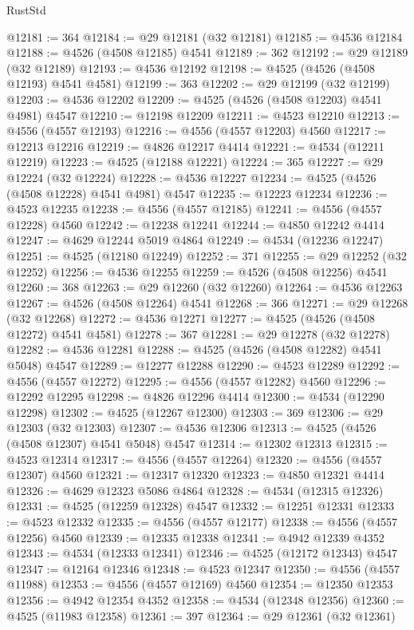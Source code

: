 \begin{lexlean}{RustStd}
\begin{coremodule}
{\begin{coremodule}
{{{{{{{{{{{{{{{{{{{{{{{{{{{{{{{{{{{{{{{{{{{{{{{{{{{{{{{@12181 := 364
@12184 := @29 @12181 (@32 @12181)
@12185 := @4536 @12184
@12188 := @4526 (@4508 @12185) @4541
@12189 := 362
@12192 := @29 @12189 (@32 @12189)
@12193 := @4536 @12192
@12198 := @4525 (@4526 (@4508 @12193) @4541 @4581)
@12199 := 363
@12202 := @29 @12199 (@32 @12199)
@12203 := @4536 @12202
@12209 := @4525 (@4526 (@4508 @12203) @4541 @4981) @4547
@12210 := @12198 @12209
@12211 := @4523 @12210
@12213 := @4556 (@4557 @12193)
@12216 := @4556 (@4557 @12203) @4560
@12217 := @12213 @12216
@12219 := @4826 @12217 @4414
@12221 := @4534 (@12211 @12219)
@12223 := @4525 (@12188 @12221)
@12224 := 365
@12227 := @29 @12224 (@32 @12224)
@12228 := @4536 @12227
@12234 := @4525 (@4526 (@4508 @12228) @4541 @4981) @4547
@12235 := @12223 @12234
@12236 := @4523 @12235
@12238 := @4556 (@4557 @12185)
@12241 := @4556 (@4557 @12228) @4560
@12242 := @12238 @12241
@12244 := @4850 @12242 @4414
@12247 := @4629 @12244 @5019 @4864
@12249 := @4534 (@12236 @12247)
@12251 := @4525 (@12180 @12249)
@12252 := 371
@12255 := @29 @12252 (@32 @12252)
@12256 := @4536 @12255
@12259 := @4526 (@4508 @12256) @4541
@12260 := 368
@12263 := @29 @12260 (@32 @12260)
@12264 := @4536 @12263
@12267 := @4526 (@4508 @12264) @4541
@12268 := 366
@12271 := @29 @12268 (@32 @12268)
@12272 := @4536 @12271
@12277 := @4525 (@4526 (@4508 @12272) @4541 @4581)
@12278 := 367
@12281 := @29 @12278 (@32 @12278)
@12282 := @4536 @12281
@12288 := @4525 (@4526 (@4508 @12282) @4541 @5048) @4547
@12289 := @12277 @12288
@12290 := @4523 @12289
@12292 := @4556 (@4557 @12272)
@12295 := @4556 (@4557 @12282) @4560
@12296 := @12292 @12295
@12298 := @4826 @12296 @4414
@12300 := @4534 (@12290 @12298)
@12302 := @4525 (@12267 @12300)
@12303 := 369
@12306 := @29 @12303 (@32 @12303)
@12307 := @4536 @12306
@12313 := @4525 (@4526 (@4508 @12307) @4541 @5048) @4547
@12314 := @12302 @12313
@12315 := @4523 @12314
@12317 := @4556 (@4557 @12264)
@12320 := @4556 (@4557 @12307) @4560
@12321 := @12317 @12320
@12323 := @4850 @12321 @4414
@12326 := @4629 @12323 @5086 @4864
@12328 := @4534 (@12315 @12326)
@12331 := @4525 (@12259 @12328) @4547
@12332 := @12251 @12331
@12333 := @4523 @12332
@12335 := @4556 (@4557 @12177)
@12338 := @4556 (@4557 @12256) @4560
@12339 := @12335 @12338
@12341 := @4942 @12339 @4352
@12343 := @4534 (@12333 @12341)
@12346 := @4525 (@12172 @12343) @4547
@12347 := @12164 @12346
@12348 := @4523 @12347
@12350 := @4556 (@4557 @11988)
@12353 := @4556 (@4557 @12169) @4560
@12354 := @12350 @12353
@12356 := @4942 @12354 @4352
@12358 := @4534 (@12348 @12356)
@12360 := @4525 (@11983 @12358)
@12361 := 397
@12364 := @29 @12361 (@32 @12361)
}}}}}}}}}}}}}}}}}}}}}}}}}}}}}}}}}}}}}}}}}}}}}}}}}}}}}}}
\end{coremodule}}
\end{coremodule}
\end{lexlean}
